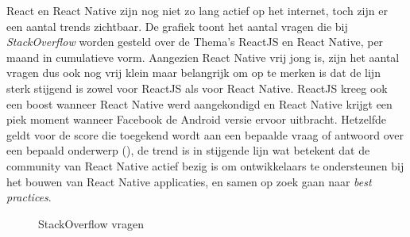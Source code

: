 React en React Native zijn nog niet zo lang actief op het internet, toch zijn er een aantal trends zichtbaar.
De grafiek  toont het aantal vragen die bij \emph{StackOverflow} worden gesteld over de Thema’s ReactJS en React Native, per maand in cumulatieve vorm. Aangezien React Native vrij jong is, zijn het aantal vragen dus ook nog vrij klein maar belangrijk om op te merken is dat de lijn sterk stijgend is zowel voor ReactJS als voor React Native. ReactJS kreeg ook een boost wanneer React Native werd aangekondigd en React Native krijgt een piek moment wanneer Facebook de Android versie ervoor uitbracht. Hetzelfde geldt voor de score die toegekend wordt aan een bepaalde vraag of antwoord over een bepaald onderwerp (), de trend is in stijgende lijn wat betekent dat de community van React Native actief bezig is om ontwikkelaars te ondersteunen bij het bouwen van React Native applicaties, en samen op zoek gaan naar \emph{best practices}. 
\begin{figure}
	\centering
	\caption{StackOverflow vragen}
	\label{fig:questions}
\end{figure}
